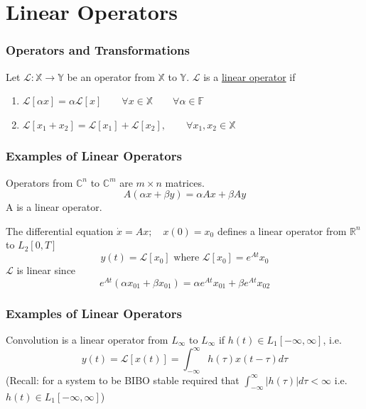 \documentclass{beamer}
\begin{document}
\section{Linear Operators}
\frame{\sectionpage}

\begin{frame}\frametitle{Operators and Transformations}
\begin{definition}	
	Let $\mathcal{L}:\mathbb{X}\to\mathbb{Y}$ be an operator from $\mathbb{X}$ to
$\mathbb{Y}$.  $\mathcal{L}$ is a \underline{linear operator} if
\begin{enumerate}
  \item $\mathcal{L}[\alpha x] = \alpha \mathcal{L}[x] \qquad \forall x \in \mathbb{X} \qquad \forall \alpha \in \mathbb{F}$
  \item $\mathcal{L}[x_1 + x_2] = \mathcal{L}[x_1] + \mathcal{L}[x_2], \qquad \forall x_1, x_2\in\mathbb{X}$
\end{enumerate}
\end{definition}

\end{frame}

\begin{frame}\frametitle{Examples of Linear Operators}
\begin{example}[Matrices]	
Operators from $\mathbb{C}^n$ to $\mathbb{C}^m$ are $m \times n$ matrices.
\[ A(\alpha x + \beta y) = \alpha Ax + \beta Ay \] 
A is a linear operator.
\end{example}

\begin{example}
The differential equation $\dot{x} = Ax; \quad x(0) = x_0$
defines a linear operator from $\mathbb{R}^n$ to $L_2[0,T]$
\[
y(t) = \mathcal{L}[x_0] \text{ where } \mathcal{L}[x_0] = e^{At}x_0 
\]
\indent $\mathcal{L}$ is linear since 
\[ 
e^{At}(\alpha x_{01} + \beta  x_{01}) = \alpha e^{At}x_{01} + \beta e^{At}x_{02} 
\]
\end{example}


\end{frame}

\begin{frame}\frametitle{Examples of Linear Operators}
\begin{example}[Convolution]
Convolution is a linear operator from $L_{\infty}$ to
$L_{\infty}$ if $h(t) \in L_1[-\infty,\infty]$, i.e.
\[ y(t) = \mathcal{L}[x(t)] = \int_{-\infty}^{\infty} h(\tau)x(t - \tau)
d\tau \] 
\indent (Recall: for a system to be BIBO stable required
that $\int_{-\infty}^{\infty}|h(\tau)|d\tau <\infty$
\indent i.e. $h(t) \in L_1[-\infty,\infty]$)
\end{example}
\end{frame}
\end{document}
